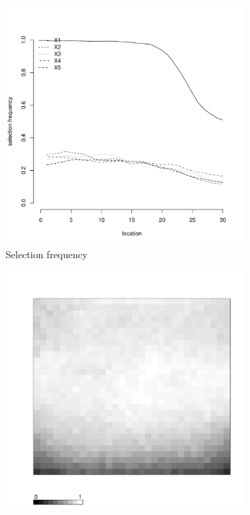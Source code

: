 \documentclass[authoryear, review, 11pt]{elsarticle}
\begin{document}
\begin{figure}
\begin{subfigure}[b]{0.45\textwidth}
		\includegraphics[width=\textwidth]{../../figures/simulation/15.14.profile_selection.pdf}
		\caption{Selection frequency}
	\end{subfigure}
	\begin{subfigure}[b]{0.45\textwidth}
	\centering
		\includegraphics[width=\textwidth]{../../figures/simulation/X1.15.14.unshrunk_bootstrap_coverage.pdf}

\end{subfigure}
\end{figure}
\end{document}
